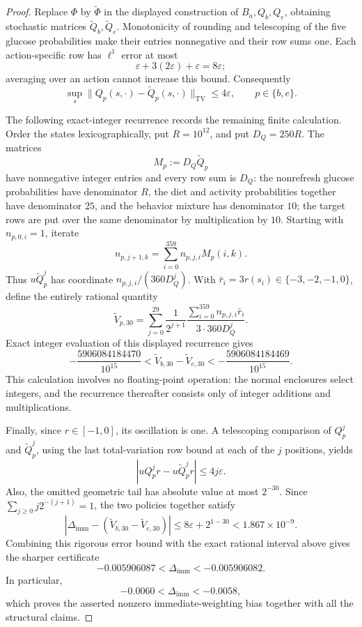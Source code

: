 \documentclass{article}
\begin{document}
\begin{proof}
Replace \(\Phi\) by \(\widetilde\Phi\) in the displayed construction
of \(B_a,Q_b,Q_e\), obtaining stochastic matrices
\(\widetilde Q_b,\widetilde Q_e\).  Monotonicity of rounding and
telescoping of the five glucose probabilities make their entries
nonnegative and their row sums one.  Each action-specific row has
\(\ell^1\) error at most
\[
 \varepsilon+3(2\varepsilon)+\varepsilon=8\varepsilon;
\]
averaging over an action cannot increase this bound.  Consequently
\[
 \sup_s\|Q_p(s,\cdot)-\widetilde Q_p(s,\cdot)\|_{\mathrm{TV}}
 \le4\varepsilon,\qquad p\in\{b,e\}.
\]

The following exact-integer recurrence records the remaining finite
calculation.  Order the states lexicographically, put
\(R=10^{12}\), and put \(D_Q=250R\).  The matrices
\[
 M_p:=D_Q\widetilde Q_p
\]
have nonnegative integer entries and every row sum is \(D_Q\): the
nonrefresh glucose probabilities have denominator \(R\), the diet and
activity probabilities together have denominator \(25\), and the
behavior mixture has denominator \(10\); the target rows are put over
the same denominator by multiplication by \(10\).  Starting with
\(n_{p,0,i}=1\), iterate
\[
 n_{p,j+1,k}=\sum_{i=0}^{359}n_{p,j,i}M_p(i,k).
\]
Thus \(u\widetilde Q_p^j\) has coordinate
\(n_{p,j,i}/(360D_Q^j)\).  With \(\bar r_i=3r(s_i)\in\{-3,-2,-1,0\}\),
define the entirely rational quantity
\[
 \widetilde V_{p,30}
 =\sum_{j=0}^{29}\frac1{2^{j+1}}
   \frac{\sum_{i=0}^{359}n_{p,j,i}\bar r_i}{3\cdot360D_Q^j}.
\]
Exact integer evaluation of this displayed recurrence gives
\[
 -\frac{5906084184470}{10^{15}}
 <\widetilde V_{b,30}-\widetilde V_{e,30}
 <-\frac{5906084184469}{10^{15}}.
\]
This calculation involves no floating-point operation: the normal
enclosures select integers, and the recurrence thereafter consists
only of integer additions and multiplications.

Finally, since \(r\in[-1,0]\), its oscillation is one.  A telescoping
comparison of \(Q_p^j\) and \(\widetilde Q_p^j\), using the last
total-variation row bound at each of the \(j\) positions, yields
\[
 |uQ_p^jr-u\widetilde Q_p^jr|\le4j\varepsilon.
\]
Also, the omitted geometric tail has absolute value at most
\(2^{-30}\).  Since \(\sum_{j\ge0}j2^{-(j+1)}=1\), the two policies
together satisfy
\[
 \left|\Delta_{\mathrm{imm}}-
   (\widetilde V_{b,30}-\widetilde V_{e,30})\right|
 \le8\varepsilon+2^{1-30}<1.867\times10^{-9}.
\]
Combining this rigorous error bound with the exact rational interval
above gives the sharper certificate
\[
 -0.005906087<\Delta_{\mathrm{imm}}<-0.005906082.
\]
In particular,
\[
 -0.0060<\Delta_{\mathrm{imm}}<-0.0058,
\]
which proves the asserted nonzero immediate-weighting bias together
with all the structural claims.
\end{proof}
\end{document}
